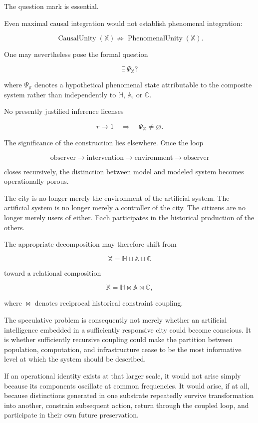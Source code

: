 \documentclass[11pt]{article}
\begin{document}
The question mark is essential.

Even maximal causal integration would not establish phenomenal integration:

\[
\boxed{
\operatorname{CausalUnity}(\mathbb{X})
\not\Rightarrow
\operatorname{PhenomenalUnity}(\mathbb{X}).
}
\]

One may nevertheless pose the formal question

\[
\exists\,\Psi_{\mathbb{X}}?
\]

where $\Psi_{\mathbb{X}}$ denotes a hypothetical phenomenal state attributable to the composite system rather than independently to $\mathbb{H}$, $\mathbb{A}$, or $\mathbb{C}$.

No presently justified inference licenses

\[
r\rightarrow1
\quad\Rightarrow\quad
\Psi_{\mathbb{X}}\neq\varnothing.
\]

The significance of the construction lies elsewhere. Once the loop

\[
\text{observer}
\rightarrow
\text{intervention}
\rightarrow
\text{environment}
\rightarrow
\text{observer}
\]

closes recursively, the distinction between model and modeled system becomes operationally porous.

The city is no longer merely the environment of the artificial system. The artificial system is no longer merely a controller of the city. The citizens are no longer merely users of either. Each participates in the historical production of the others.

The appropriate decomposition may therefore shift from

\[
\mathbb{X}
=
\mathbb{H}
\sqcup
\mathbb{A}
\sqcup
\mathbb{C}
\]

toward a relational composition

\[
\boxed{
\mathbb{X}
=
\mathbb{H}
\bowtie
\mathbb{A}
\bowtie
\mathbb{C},
}
\]

where $\bowtie$ denotes reciprocal historical constraint coupling.

The speculative problem is consequently not merely whether an artificial intelligence embedded in a sufficiently responsive city could become conscious. It is whether sufficiently recursive coupling could make the partition between population, computation, and infrastructure cease to be the most informative level at which the system should be described.

If an operational identity exists at that larger scale, it would not arise simply because its components oscillate at common frequencies. It would arise, if at all, because distinctions generated in one substrate repeatedly survive transformation into another, constrain subsequent action, return through the coupled loop, and participate in their own future preservation.
\end{document}
